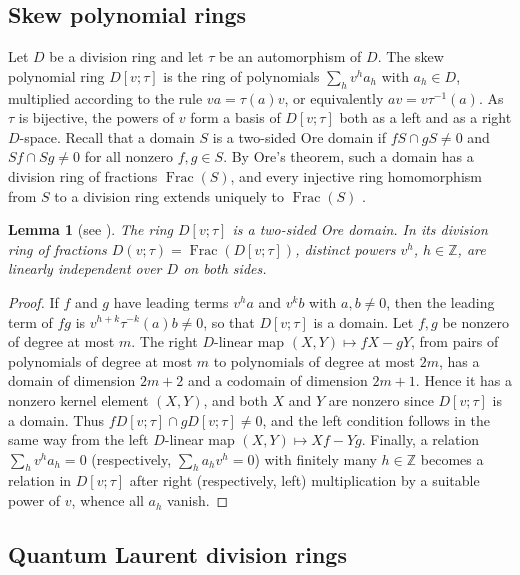 \documentclass[11pt,a4paper]{amsart}
\newtheorem{lemma}[theorem]{Lemma}
\numberwithin{equation}{section}
\newcommand{\Frac}{\operatorname{Frac}}
\begin{document}
\subsection{Skew polynomial rings}\label{subsec:skew}

Let $D$ be a division ring and let $\tau$ be an automorphism of $D$. The skew polynomial ring $D[v;\tau]$ is the ring of polynomials $\sum_hv^ha_h$ with $a_h\in D$, multiplied according to the rule $va=\tau(a)v$, or equivalently $av=v\tau^{-1}(a)$. As $\tau$ is bijective, the powers of $v$ form a basis of $D[v;\tau]$ both as a left and as a right $D$-space. Recall that a domain $S$ is a two-sided Ore domain if $fS\cap gS\ne0$ and $Sf\cap Sg\ne0$ for all nonzero $f,g\in S$. By Ore's theorem, such a domain has a division ring of fractions $\Frac(S)$, and every injective ring homomorphism from $S$ to a division ring extends uniquely to $\Frac(S)$ \cite{Co,GW}.

\begin{lemma}[{see \cite{Co,GW}}]\label{lem:skew}
The ring $D[v;\tau]$ is a two-sided Ore domain. In its division ring of fractions $D(v;\tau)=\Frac(D[v;\tau])$, distinct powers $v^h$, $h\in\mathbb Z$, are linearly independent over $D$ on both sides.
\end{lemma}

\begin{proof}
If $f$ and $g$ have leading terms $v^ha$ and $v^kb$ with $a,b\ne0$, then the leading term of $fg$ is $v^{h+k}\tau^{-k}(a)b\ne0$, so that $D[v;\tau]$ is a domain. Let $f,g$ be nonzero of degree at most $m$. The right $D$-linear map $(X,Y)\mapsto fX-gY$, from pairs of polynomials of degree at most $m$ to polynomials of degree at most $2m$, has a domain of dimension $2m+2$ and a codomain of dimension $2m+1$. Hence it has a nonzero kernel element $(X,Y)$, and both $X$ and $Y$ are nonzero since $D[v;\tau]$ is a domain. Thus $fD[v;\tau]\cap gD[v;\tau]\ne0$, and the left condition follows in the same way from the left $D$-linear map $(X,Y)\mapsto Xf-Yg$. Finally, a relation $\sum_hv^ha_h=0$ (respectively, $\sum_ha_hv^h=0$) with finitely many $h\in\mathbb Z$ becomes a relation in $D[v;\tau]$ after right (respectively, left) multiplication by a suitable power of $v$, whence all $a_h$ vanish.
\end{proof}

\subsection{Quantum Laurent division rings}\label{subsec:qtorus}
\end{document}
